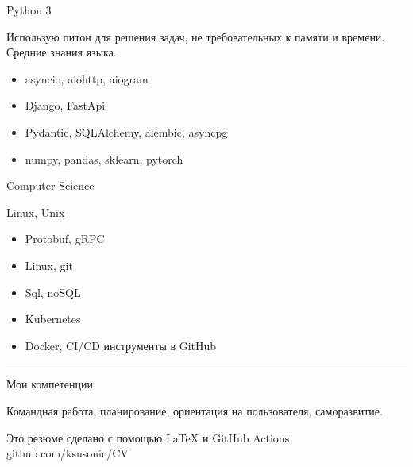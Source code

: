 \documentclass[a4paper,10pt]{article}
\newlength{\cvcolumngapwidth}
\newlength{\cvleftcolumnwidth}
\newlength{\cvrightcolumnwidth}
\newcommand{\cvsectionstyle}[1]{{\normalsize\cvsectionfont\textcolor{cvsectioncolor}{#1}}}
\newcommand{\cvheadingstyle}[1]{{\normalsize\cvheadingfont\textcolor{cvheadingcolor}{#1}}}
\newlength{\cvafteritemskipamount}
\newlength{\cvaftersectionskipamount}
\newlength{\cvbetweensectionandheadingextraskipamount}
\newlength{\cvparskip}
\newcommand{\cvsection}[1]{
    \begin{minipage}[t]{\cvleftcolumnwidth}
        \raggedleft\cvsectionstyle{#1}
    \end{minipage}%
    \hspace{\cvcolumngapwidth}%
    \begin{minipage}[t]{\cvrightcolumnwidth}
        \textcolor{cvrulecolor}{\rule{\cvrightcolumnwidth}{0.3mm}}
    \end{minipage}

    \vspace{\cvaftersectionskipamount}
}
\newcommand{\cvitem}[2]{
    \begin{minipage}[t]{\cvleftcolumnwidth}
        \raggedleft #1
    \end{minipage}%
    \hspace{\cvcolumngapwidth}%
    \begin{minipage}[t]{\cvrightcolumnwidth}
        \setlength{\parskip}{\cvparskip} #2
    \end{minipage}

    \vspace{\cvafteritemskipamount}
}
\begin{document}
\cvitem{
    \cvheadingstyle{Python 3}
}{
    Использую питон для решения задач, не требовательных к памяти и времени. Средние знания языка.
    \begin{itemize}
        \item asyncio, aiohttp, aiogram
        \item Django, FastApi
        \item Pydantic, SQLAlchemy, alembic, asyncpg
        \item numpy, pandas, sklearn, pytorch
    \end{itemize}
}

\cvitem{
    \cvheadingstyle{Computer Science}
}{
    Linux, Unix
    \begin{itemize}
        \item Protobuf, gRPC
        \item Linux, git
        \item Sql, noSQL
        \item Kubernetes
        \item Docker, CI/CD инструменты в GitHub
    \end{itemize}
}



\cvsection{}

\vspace{\cvbetweensectionandheadingextraskipamount}

\cvitem{
    \cvheadingstyle{Мои компетенции}
}{
    Командная работа, планирование, ориентация на пользователя, саморазвитие.
}

Это резюме сделано с помощью LaTeX и GitHub Actions: github.com/ksusonic/CV
\end{document}
